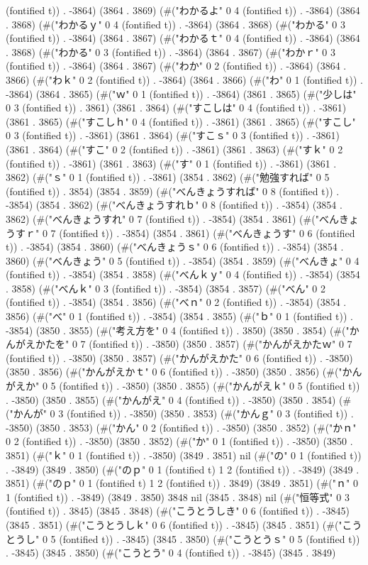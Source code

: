 (fontified t)) . -3864) (3864 . 3869) (#("わかるよ" 0 4 (fontified t)) . -3864) (3864 . 3868) (#("わかるｙ" 0 4 (fontified t)) . -3864) (3864 . 3868) (#("わかる" 0 3 (fontified t)) . -3864) (3864 . 3867) (#("わかるｔ" 0 4 (fontified t)) . -3864) (3864 . 3868) (#("わかる" 0 3 (fontified t)) . -3864) (3864 . 3867) (#("わかｒ" 0 3 (fontified t)) . -3864) (3864 . 3867) (#("わか" 0 2 (fontified t)) . -3864) (3864 . 3866) (#("わｋ" 0 2 (fontified t)) . -3864) (3864 . 3866) (#("わ" 0 1 (fontified t)) . -3864) (3864 . 3865) (#("ｗ" 0 1 (fontified t)) . -3864) (3861 . 3865) (#("少しは" 0 3 (fontified t)) . 3861) (3861 . 3864) (#("すこしは" 0 4 (fontified t)) . -3861) (3861 . 3865) (#("すこしｈ" 0 4 (fontified t)) . -3861) (3861 . 3865) (#("すこし" 0 3 (fontified t)) . -3861) (3861 . 3864) (#("すこｓ" 0 3 (fontified t)) . -3861) (3861 . 3864) (#("すこ" 0 2 (fontified t)) . -3861) (3861 . 3863) (#("すｋ" 0 2 (fontified t)) . -3861) (3861 . 3863) (#("す" 0 1 (fontified t)) . -3861) (3861 . 3862) (#("ｓ" 0 1 (fontified t)) . -3861) (3854 . 3862) (#("勉強すれば" 0 5 (fontified t)) . 3854) (3854 . 3859) (#("べんきょうすれば" 0 8 (fontified t)) . -3854) (3854 . 3862) (#("べんきょうすれｂ" 0 8 (fontified t)) . -3854) (3854 . 3862) (#("べんきょうすれ" 0 7 (fontified t)) . -3854) (3854 . 3861) (#("べんきょうすｒ" 0 7 (fontified t)) . -3854) (3854 . 3861) (#("べんきょうす" 0 6 (fontified t)) . -3854) (3854 . 3860) (#("べんきょうｓ" 0 6 (fontified t)) . -3854) (3854 . 3860) (#("べんきょう" 0 5 (fontified t)) . -3854) (3854 . 3859) (#("べんきょ" 0 4 (fontified t)) . -3854) (3854 . 3858) (#("べんｋｙ" 0 4 (fontified t)) . -3854) (3854 . 3858) (#("べんｋ" 0 3 (fontified t)) . -3854) (3854 . 3857) (#("べん" 0 2 (fontified t)) . -3854) (3854 . 3856) (#("べｎ" 0 2 (fontified t)) . -3854) (3854 . 3856) (#("べ" 0 1 (fontified t)) . -3854) (3854 . 3855) (#("ｂ" 0 1 (fontified t)) . -3854) (3850 . 3855) (#("考え方を" 0 4 (fontified t)) . 3850) (3850 . 3854) (#("かんがえかたを" 0 7 (fontified t)) . -3850) (3850 . 3857) (#("かんがえかたｗ" 0 7 (fontified t)) . -3850) (3850 . 3857) (#("かんがえかた" 0 6 (fontified t)) . -3850) (3850 . 3856) (#("かんがえかｔ" 0 6 (fontified t)) . -3850) (3850 . 3856) (#("かんがえか" 0 5 (fontified t)) . -3850) (3850 . 3855) (#("かんがえｋ" 0 5 (fontified t)) . -3850) (3850 . 3855) (#("かんがえ" 0 4 (fontified t)) . -3850) (3850 . 3854) (#("かんが" 0 3 (fontified t)) . -3850) (3850 . 3853) (#("かんｇ" 0 3 (fontified t)) . -3850) (3850 . 3853) (#("かん" 0 2 (fontified t)) . -3850) (3850 . 3852) (#("かｎ" 0 2 (fontified t)) . -3850) (3850 . 3852) (#("か" 0 1 (fontified t)) . -3850) (3850 . 3851) (#("ｋ" 0 1 (fontified t)) . -3850) (3849 . 3851) nil (#("の" 0 1 (fontified t)) . -3849) (3849 . 3850) (#("のｐ" 0 1 (fontified t) 1 2 (fontified t)) . -3849) (3849 . 3851) (#("のｐ" 0 1 (fontified t) 1 2 (fontified t)) . 3849) (3849 . 3851) (#("ｎ" 0 1 (fontified t)) . -3849) (3849 . 3850) 3848 nil (3845 . 3848) nil (#("恒等式" 0 3 (fontified t)) . 3845) (3845 . 3848) (#("こうとうしき" 0 6 (fontified t)) . -3845) (3845 . 3851) (#("こうとうしｋ" 0 6 (fontified t)) . -3845) (3845 . 3851) (#("こうとうし" 0 5 (fontified t)) . -3845) (3845 . 3850) (#("こうとうｓ" 0 5 (fontified t)) . -3845) (3845 . 3850) (#("こうとう" 0 4 (fontified t)) . -3845) (3845 . 3849) 